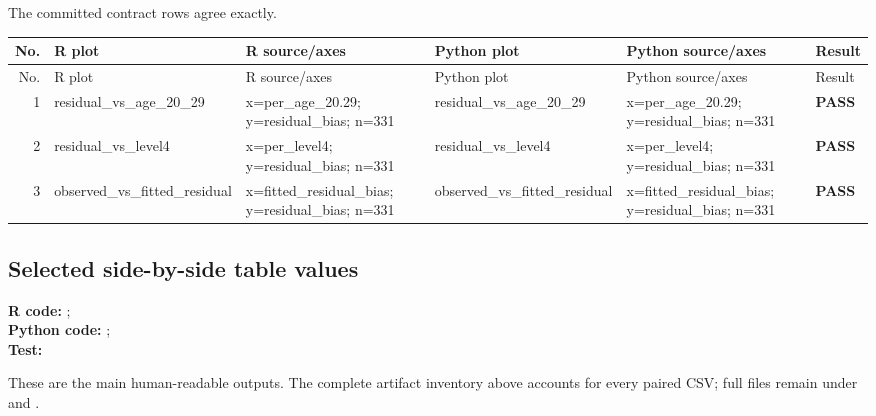 \documentclass[10pt]{article}
\begin{document}
The committed contract rows agree exactly.

\footnotesize
\begin{longtable}{@{}r p{}p{}p{}p{}l@{}}
\toprule
No. & R plot & R source/axes & Python plot & Python source/axes & Result \\
\midrule
\endfirsthead
\toprule
No. & R plot & R source/axes & Python plot & Python source/axes & Result \\
\midrule
\endhead
1 & residual\_\allowbreak{}vs\_\allowbreak{}age\_\allowbreak{}20\_\allowbreak{}29 & x=per\_\allowbreak{}age\_\allowbreak{}20.29; y=residual\_\allowbreak{}bias; n=331 & residual\_\allowbreak{}vs\_\allowbreak{}age\_\allowbreak{}20\_\allowbreak{}29 & x=per\_\allowbreak{}age\_\allowbreak{}20.29; y=residual\_\allowbreak{}bias; n=331 & \textcolor{passgreen}{\textbf{PASS}} \\
2 & residual\_\allowbreak{}vs\_\allowbreak{}level4 & x=per\_\allowbreak{}level4; y=residual\_\allowbreak{}bias; n=331 & residual\_\allowbreak{}vs\_\allowbreak{}level4 & x=per\_\allowbreak{}level4; y=residual\_\allowbreak{}bias; n=331 & \textcolor{passgreen}{\textbf{PASS}} \\
3 & observed\_\allowbreak{}vs\_\allowbreak{}fitted\_\allowbreak{}residual & x=fitted\_\allowbreak{}residual\_\allowbreak{}bias; y=residual\_\allowbreak{}bias; n=331 & observed\_\allowbreak{}vs\_\allowbreak{}fitted\_\allowbreak{}residual & x=fitted\_\allowbreak{}residual\_\allowbreak{}bias; y=residual\_\allowbreak{}bias; n=331 & \textcolor{passgreen}{\textbf{PASS}} \\
\bottomrule
\end{longtable}
\normalsize

\subsection{Selected side-by-side table values}
{\footnotesize \textbf{R code:} ; \\ \textbf{Python code:} ; \\ \textbf{Test:} \par}


These are the main human-readable outputs. The complete artifact inventory above accounts for every paired CSV; full files remain under  and .
\end{document}
